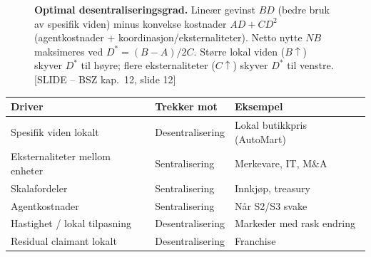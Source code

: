 \begin{figure}[H]
\centering
{}
\caption{\textbf{Optimal desentraliseringsgrad.} Lineær gevinst $BD$ (bedre bruk av spesifik viden) minus konvekse kostnader $AD + CD^2$ (agentkostnader + koordinasjon/eksternaliteter). Netto nytte $NB$ maksimeres ved $D^* = (B-A)/2C$. Større lokal viden ($B\uparrow$) skyver $D^*$ til høyre; flere eksternaliteter ($C\uparrow$) skyver $D^*$ til venstre. [SLIDE -- BSZ kap.\ 12, slide 12]}
\end{figure}

\begin{center}
\renewcommand{\arraystretch}{1.15}
\begin{tabular}{@{}p{3.7cm}p{4.4cm}p{5.4cm}@{}}
\toprule
\textbf{Driver} & \textbf{Trekker mot} & \textbf{Eksempel} \\
\midrule
Spesifik viden lokalt & Desentralisering & Lokal butikkpris (AutoMart) \\
Eksternaliteter mellom enheter & Sentralisering & Merkevare, IT, M\&A \\
Skalafordeler & Sentralisering & Innkjøp, treasury \\
Agentkostnader & Sentralisering & Når S2/S3 svake \\
Hastighet / lokal tilpasning & Desentralisering & Markeder med rask endring \\
Residual claimant lokalt & Desentralisering & Franchise \\
\bottomrule
\end{tabular}
\end{center}

